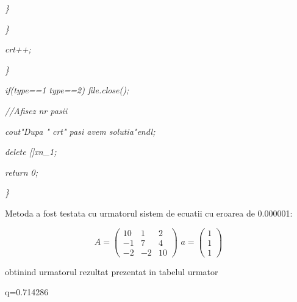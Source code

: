 \documentclass[a4paper,twoside]{book}
\begin{document}
\textit{\qquad \qquad \qquad \}}

\textit{\qquad \qquad \}}

\textit{\qquad \qquad crt++;}

\textit{\qquad \}}

\textit{\qquad if(type==1 \TEXTsymbol{\vert}\TEXTsymbol{\vert} type==2)
file.close();}

\textit{\qquad //Afisez nr pasii}

\textit{\qquad cout\TEXTsymbol{<}\TEXTsymbol{<}"Dupa "\TEXTsymbol{<}%
\TEXTsymbol{<}crt\TEXTsymbol{<}\TEXTsymbol{<}" pasi avem solutia"\TEXTsymbol{%
<}\TEXTsymbol{<}endl;}

\textit{\qquad delete []xn\_1;}

\textit{\qquad return 0;}

\textit{\}}

Metoda a fost testata cu urmatorul sistem de ecuatii cu eroarea de 0.000001:

\begin{equation*}
A=\left( 
\begin{array}{ccc}
10 & 1 & 2 \\ 
-1 & 7 & 4 \\ 
-2 & -2 & 10%
\end{array}%
\right) \,\,a=\left( 
\begin{array}{c}
1 \\ 
1 \\ 
1%
\end{array}%
\right)
\end{equation*}

obtinind urmatorul rezultat prezentat in tabelul urmator

q=0.714286
\end{document}
